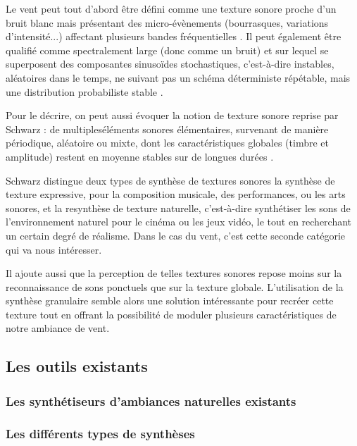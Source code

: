 ﻿\documentclass[12pt]{article}
\begin{document}
\leavevmode

Le vent peut tout d'abord être défini comme une texture sonore proche d'un bruit blanc mais présentant des micro-évènements (bourrasques, variations d'intensité...) affectant plusieurs bandes fréquentielles \parencite{mcdermott_sound_2009}. Il peut également être qualifié comme spectralement large (donc comme un bruit) et sur lequel se superposent des composantes sinusoïdes stochastiques, c'est-à-dire instables, aléatoires dans le temps, ne suivant pas un schéma déterministe répétable, mais une distribution probabiliste stable \parencite{schwarz_state_2011}.

Pour le décrire, on peut aussi évoquer la notion de texture sonore reprise par Schwarz : de multipleséléments sonores élémentaires, survenant de manière périodique, aléatoire ou mixte, dont les caractéristiques globales (timbre et amplitude) restent en moyenne stables sur de longues durées \parencite{saint-arnaud_classification_1995}.

Schwarz distingue deux types de synthèse de textures sonores la synthèse de texture expressive, pour la composition musicale, des performances, ou les arts sonores, et la resynthèse de texture naturelle, c'est-à-dire synthétiser les sons de l'environnement naturel pour le cinéma ou les jeux vidéo, le tout en recherchant un certain degré de réalisme. Dans le cas du vent, c'est cette seconde catégorie qui va nous intéresser. 

Il ajoute aussi que la perception de telles textures sonores repose moins sur la reconnaissance de sons ponctuels que sur la texture globale. L'utilisation de la synthèse granulaire semble alors une solution intéressante pour recréer cette texture tout en offrant la possibilité de moduler plusieurs caractéristiques de notre ambiance de vent.

\subsection{Les outils existants}

\subsubsection{Les synthétiseurs d’ambiances naturelles existants}

\subsubsection{Les différents types de synthèses}
\end{document}
